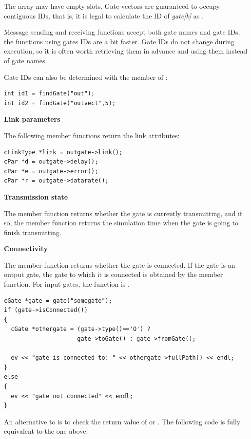 The array may have empty slots. Gate vectors are guaranteed to
occupy contiguous IDs, that is, it is legal to calculate the
ID of \textit{gate[k]} as .

Message sending and receiving functions accept both gate names
and gate IDs; the functions using gates IDs are a bit faster.
Gate IDs do not change during execution, so it is often worth
retrieving them in advance and using them instead of gate names.


Gate IDs can also be determined with the 
member of :

\begin{verbatim}
int id1 = findGate("out");
int id2 = findGate("outvect",5);
\end{verbatim}


\textbf{Link parameters}


The following member functions return the link attributes:

\begin{verbatim}
cLinkType *link = outgate->link();
cPar *d = outgate->delay();
cPar *e = outgate->error();
cPar *r = outgate->datarate();
\end{verbatim}

\textbf{Transmission state}


The  member function returns whether the gate
is currently transmitting, and if so, the
 member function
returns the simulation time when the gate is going to finish
transmitting.


\textbf{Connectivity}

%
%

The  member function returns whether
the gate is connected. If the gate is an output gate, the gate to
which it is connected is obtained by the 
member function. For input gates, the function is
.

\begin{verbatim}
cGate *gate = gate("somegate");
if (gate->isConnected())
{
  cGate *othergate = (gate->type()=='O') ?
                     gate->toGate() : gate->fromGate();

  ev << "gate is connected to: " << othergate->fullPath() << endl;
}
else
{
  ev << "gate not connected" << endl;
}
\end{verbatim}


An alternative to  is to check the return value
of  or . The following code is fully equivalent
to the one above:

